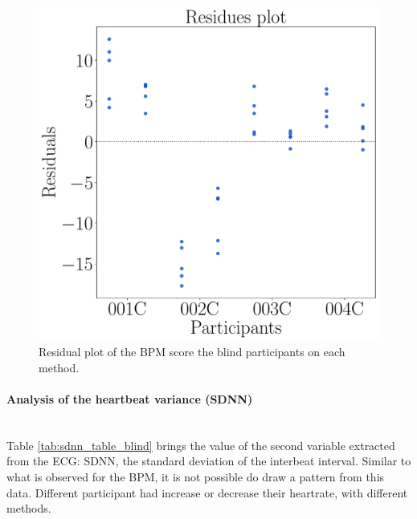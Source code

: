 \begin{figure}[!htb]
\begin{minipage}{0.45\textwidth}
        \includegraphics[width = 0.8\linewidth]{Resultados/ECG/Figuras/pdf/residplot_bpm_two_way_blind.pdf}
        \caption{Residual plot of the BPM score the blind participants on each method.}
        \label{fig:residplot_bpm_two_way_blind}
    \end{minipage}
\end{figure}



%


\FloatBarrier

%
%
\paragraph{Analysis of the heartbeat variance (SDNN)}\mbox{}\\
%
Table \ref{tab:sdnn_table_blind} brings the value of the second variable extracted from the ECG: SDNN, the standard deviation of the interbeat interval. Similar to what is observed for the BPM, it is not possible do draw a pattern from this data. Different participant had increase or decrease their heartrate, with different methods.


